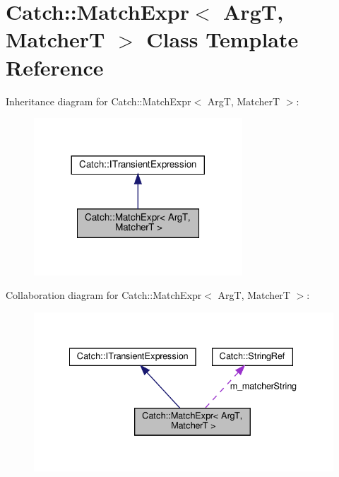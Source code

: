 \hypertarget{classCatch_1_1MatchExpr}{}\section{Catch\+:\+:Match\+Expr$<$ ArgT, MatcherT $>$ Class Template Reference}
\label{classCatch_1_1MatchExpr}


Inheritance diagram for Catch\+:\+:Match\+Expr$<$ ArgT, MatcherT $>$\+:
\nopagebreak
\begin{figure}[H]
\begin{center}
\leavevmode
\includegraphics[width=221pt]{classCatch_1_1MatchExpr__inherit__graph}
\end{center}
\end{figure}


Collaboration diagram for Catch\+:\+:Match\+Expr$<$ ArgT, MatcherT $>$\+:
\nopagebreak
\begin{figure}[H]
\begin{center}
\leavevmode
\includegraphics[width=335pt]{classCatch_1_1MatchExpr__coll__graph}
\end{center}
\end{figure}
